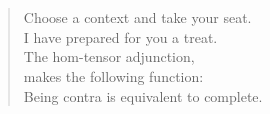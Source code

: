 
\thispagestyle{plain}
\section*{}

\vspace*{7cm}
\begin{verse}
    \hspace{8em}Choose a context and take your seat. \\
    \vspace{5pt}
    \hspace{8em}I have prepared for you a treat. \\
    \vspace{5pt}
    \hspace{8em}The hom-tensor adjunction, \\
    \vspace{5pt}
    \hspace{8em}makes the following function: \\
    \vspace{5pt}
    \hspace{8em}Being contra is equivalent to complete. 

\end{verse}